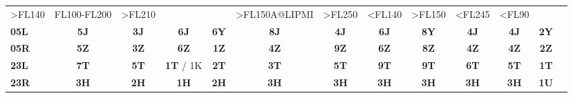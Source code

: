 \documentclass[10pt,landscape,a4paper]{article}
\begin{document}
\begin{textblock}{40}
\begin{table}[]
\begin{tabular}{lcccccccccccc}
\multicolumn{1}{r|}{\scriptsize \textgreater{}FL140} & 
\multicolumn{1}{r|}{\scriptsize FL100-FL200} & 
\multicolumn{1}{r|}{\scriptsize \textgreater{}FL210} & 
\multicolumn{1}{r||}{} & 
\multicolumn{1}{r|}{} & 
\multicolumn{1}{r|}{\scriptsize \textgreater{}FL150A@LIPMI} & 
\multicolumn{1}{r|}{\scriptsize \textgreater{}FL250} & 
\multicolumn{1}{r|}{\scriptsize \textless{}FL140} & 
\multicolumn{1}{r|}{\scriptsize \textgreater{}FL150} & 
\multicolumn{1}{r|}{\scriptsize \textless{}FL245} & 
\multicolumn{1}{l|}{\scriptsize \textless{}FL90} & 
\multicolumn{1}{c|}{} \\ \cline{1-12}
\multicolumn{1}{|l|}{\textbf{05L}} & 
\multicolumn{1}{c|}{\textbf{5J}} & 
\multicolumn{1}{c|}{\textbf{3J}} & 
\multicolumn{1}{c|}{\textbf{6J}} & 
\multicolumn{1}{c||}{\textbf{6Y}} & 
\multicolumn{1}{c|}{\textbf{8J}} & 
\multicolumn{1}{c|}{\textbf{4J}} & 
\multicolumn{1}{c|}{\textbf{6J}} & 
\multicolumn{1}{c|}{\textbf{8Y}} & 
\multicolumn{1}{c|}{\textbf{4J}} & 
\multicolumn{1}{c|}{\textbf{4J}} & 
\multicolumn{1}{c|}{\textbf{2Y}} & 
\multicolumn{1}{c|}{} \\ \cline{1-12}
\multicolumn{1}{|l|}{\textbf{05R}} & 
\multicolumn{1}{c|}{\textbf{5Z}} & 
\multicolumn{1}{c|}{\textbf{3Z}} & 
\multicolumn{1}{c|}{\textbf{6Z}} & 
\multicolumn{1}{c||}{\textbf{1Z}} & 
\multicolumn{1}{c|}{\textbf{4Z}} & 
\multicolumn{1}{c|}{\textbf{9Z}} & 
\multicolumn{1}{c|}{\textbf{6Z}} & 
\multicolumn{1}{c|}{\textbf{8Z}} & 
\multicolumn{1}{c|}{\textbf{4Z}} & 
\multicolumn{1}{c|}{\textbf{4Z}} & 
\multicolumn{1}{c|}{\textbf{2Z}} & 
\multicolumn{1}{c|}{} \\ \cline{1-12}
\multicolumn{1}{|l|}{\textbf{23L}} & 
\multicolumn{1}{c|}{\textbf{7T}} & 
\multicolumn{1}{c|}{\textbf{5T}} & 
\multicolumn{1}{c|}{\textbf{1T} / 1K} & 
\multicolumn{1}{c||}{\textbf{2T}} & 
\multicolumn{1}{c|}{\textbf{3T}} & 
\multicolumn{1}{c|}{\textbf{5T}} & 
\multicolumn{1}{c|}{\textbf{9T}} & 
\multicolumn{1}{c|}{\textbf{9T}} & 
\multicolumn{1}{c|}{\textbf{6T}} & 
\multicolumn{1}{c|}{\textbf{5T}} & 
\multicolumn{1}{c|}{\textbf{1T}} & 
\multicolumn{1}{c|}{} \\ \cline{1-12}
\multicolumn{1}{|l|}{\textbf{23R}} & 
\multicolumn{1}{c|}{\textbf{3H}} & 
\multicolumn{1}{c|}{\textbf{2H}} & 
\multicolumn{1}{c|}{\textbf{1H}} & 
\multicolumn{1}{c||}{\textbf{2H}} & 
\multicolumn{1}{c|}{\textbf{3H}} & 
\multicolumn{1}{c|}{\textbf{3H}} & 
\multicolumn{1}{c|}{\textbf{3H}} & 
\multicolumn{1}{c|}{\textbf{3H}} & 
\multicolumn{1}{c|}{\textbf{3H}} & 
\multicolumn{1}{c|}{\textbf{3H}} & 
\multicolumn{1}{c|}{\textbf{1U}} & 

\end{tabular}
\end{table}
\end{textblock}
\end{document}

